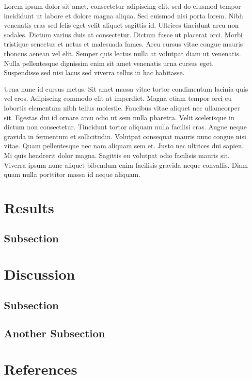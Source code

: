 \documentclass[
  11pt,
  twocolumn,
  twoside]{article}
\begin{document}
Lorem ipsum dolor sit amet, consectetur adipiscing elit, sed do eiusmod
tempor incididunt ut labore et dolore magna aliqua. Sed euismod nisi
porta lorem. Nibh venenatis cras sed felis eget velit aliquet sagittis
id. Ultrices tincidunt arcu non sodales. Dictum varius duis at
consectetur. Dictum fusce ut placerat orci. Morbi tristique senectus et
netus et malesuada fames. Arcu cursus vitae congue mauris rhoncus aenean
vel elit. Semper quis lectus nulla at volutpat diam ut venenatis. Nulla
pellentesque dignissim enim sit amet venenatis urna cursus eget.
Suspendisse sed nisi lacus sed viverra tellus in hac habitasse.

Urna nunc id cursus metus. Sit amet massa vitae tortor condimentum
lacinia quis vel eros. Adipiscing commodo elit at imperdiet. Magna etiam
tempor orci eu lobortis elementum nibh tellus molestie. Faucibus vitae
aliquet nec ullamcorper sit. Egestas dui id ornare arcu odio ut sem
nulla pharetra. Velit scelerisque in dictum non consectetur. Tincidunt
tortor aliquam nulla facilisi cras. Augue neque gravida in fermentum et
sollicitudin. Volutpat consequat mauris nunc congue nisi vitae. Quam
pellentesque nec nam aliquam sem et. Justo nec ultrices dui sapien. Mi
quis hendrerit dolor magna. Sagittis eu volutpat odio facilisis mauris
sit. Viverra ipsum nunc aliquet bibendum enim facilisis gravida neque
convallis. Diam quam nulla porttitor massa id neque aliquam.

\hypertarget{results}{%
\section{Results}\label{results}}

\hypertarget{subsection}{%
\subsection{Subsection}\label{subsection}}

\hypertarget{discussion}{%
\section{Discussion}\label{discussion}}

\hypertarget{subsection-1}{%
\subsection{Subsection}\label{subsection-1}}

\hypertarget{another-subsection}{%
\subsection{Another Subsection}\label{another-subsection}}

\hypertarget{references}{%
\section{References}\label{references}}
\end{document}
